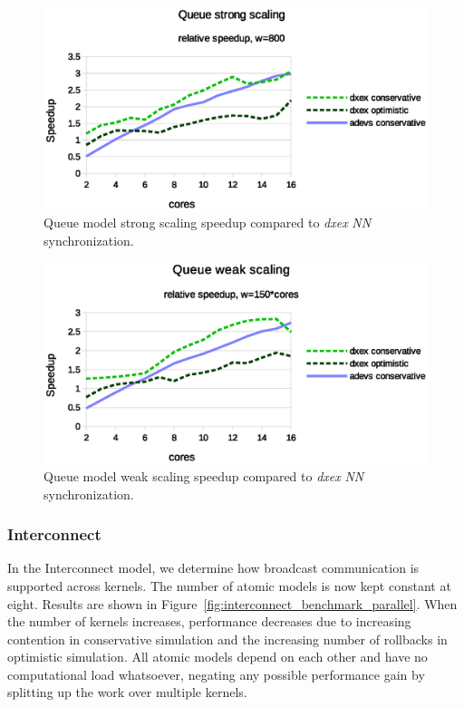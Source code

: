 \begin{figure}
	\center
	\includegraphics[width=\columnwidth]{fig/queue_fixed_strong_speedup.eps}
	\caption{Queue model strong scaling speedup compared to \textit{dxex} \textit{NN} synchronization.}
	\label{fig:Queue_plot_strong}
\end{figure}

\begin{figure}
	\center
	\includegraphics[width=\columnwidth]{fig/queue_fixed_weak_speedup.eps}
	\caption{Queue model weak scaling speedup compared to \textit{dxex} \textit{NN} synchronization.}
	\label{fig:Queue_plot_weak}
\end{figure}
	
\subsubsection{Interconnect}
\label{subsec:parallelinterconnect}
In the Interconnect model, we determine how broadcast communication is supported across kernels.
The number of atomic models is now kept constant at eight.
Results are shown in Figure~\ref{fig:interconnect_benchmark_parallel}.
When the number of kernels increases, performance decreases due to increasing contention in conservative simulation and the increasing number of rollbacks in optimistic simulation.
All atomic models depend on each other and have no computational load whatsoever, negating any possible performance gain by splitting up the work over multiple kernels.

